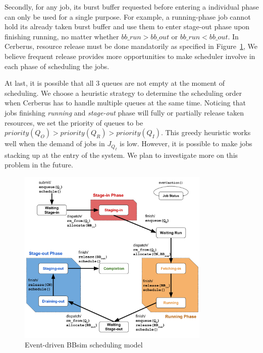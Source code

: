 Secondly, for any job,
its burst buffer requested before entering a individual phase can only be used for a single purpose.
For example, a running-phase job cannot hold its already taken burst buffer
and use them to enter stage-out phase upon finishing running,
no matter whether $bb\_run > bb\_out$ or $bb\_run < bb\_out$.
In Cerberus, resource release must be done mandatorily as specified in Figure~\ref{Fig:JobFSM},
We believe frequent release provides more opportunities to make
scheduler involve in each phase of scheduling the jobs.

At last, it is possible that all 3 queues are not empty at the moment of scheduling.
We choose a heuristic strategy to determine the scheduling order when
Cerberus has to handle multiple queues at the same time.
Noticing that jobs finishing \textit{running} and \textit{stage-out} phase
will fully or partially release taken resources,
we set the priority of queues to be $priority(Q_O) > priority(Q_R) > priority(Q_I)$.
This greedy heuristic works well when the demand of jobs in $J_{Q_I}$ is low.
However, it is possible to make jobs stacking up at the entry of the system.
We plan to investigate more on this problem in the future.

\begin{figure}[!htbp]
\centering
        \includegraphics[width=3.6in]{3PhaseJobFSM}
        \caption{Event-driven BBsim scheduling model}
\label{Fig:JobFSM}
\end{figure}

